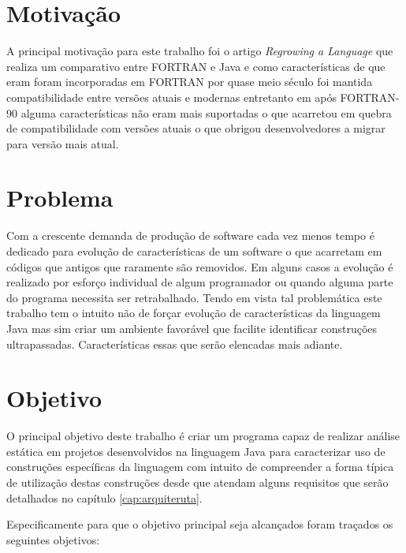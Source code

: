 \section{Motivação}
A principal motivação para este trabalho foi o artigo \textit{Regrowing a Language} \cite{Overbey:2009} que realiza um comparativo entre FORTRAN e Java  e como características de que eram foram incorporadas em FORTRAN por quase meio século foi mantida compatibilidade entre versões atuais e modernas entretanto em após FORTRAN-90 alguma características não eram mais suportadas o que acarretou em quebra de compatibilidade com versões atuais o que obrigou desenvolvedores a migrar para versão mais atual.
	
\section{Problema}
Com a crescente demanda de produção de software cada vez menos tempo é dedicado para evolução de características de um software o que acarretam em códigos que antigos que raramente são removidos. Em alguns casos a evolução é realizado por esforço individual de algum programador ou quando alguma parte do programa necessita ser retrabalhado. Tendo em vista tal problemática este trabalho tem o intuito não de forçar evolução de características da linguagem Java mas sim criar um ambiente favorável que facilite identificar construções ultrapassadas. Características essas que serão elencadas mais adiante.

\section{Objetivo}
O principal objetivo deste trabalho é criar um programa capaz de realizar análise estática em projetos desenvolvidos na linguagem Java para caracterizar uso de construções específicas da linguagem com intuito de compreender a forma típica de utilização destas construções desde que atendam alguns requisitos que serão detalhados no capítulo \ref{cap:arquiteruta}.
	
Especificamente para que o objetivo principal seja alcançados foram traçados os seguintes objetivos:

